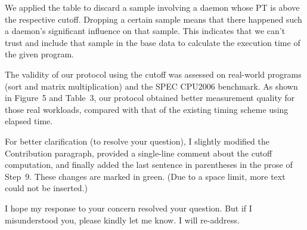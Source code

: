 \documentclass[10pt,letterpaper]{article}
\begin{document}
We applied the table to discard a sample involving 
a daemon whose PT is above the respective cutoff. Dropping a certain sample means that there happened such a daemon's significant influence on that sample. 
This indicates that we can't trust and include that sample in the base data to calculate the execution time of the given program. 

The validity of our protocol using the cutoff was assessed on real-world programs (sort and matrix multiplication) and the SPEC CPU2006 benchmark. 
As shown in Figure~5 and Table~3, our protocol obtained better measurement quality 
for those real workloads, compared with that of the existing timing scheme using elapsed time.  

For better clarification (to resolve your question), I slightly modified the Contribution paragraph, 
provided a single-line comment about the cutoff computation, and finally 
added the last sentence in parentheses in the prose of Step~9. 
These changes are marked in green. (Due to a space limit, more text could not be inserted.)

I hope my response to your concern resolved your question. But if I misunderstood you, please kindly let me know. I will re-address. 
\end{document}
